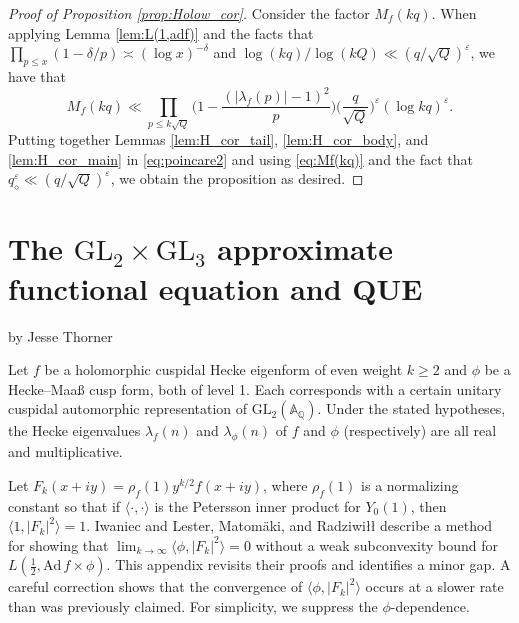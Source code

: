 \documentclass[12pt,reqno]{amsart}
\theoremstyle{remark}
\numberwithin{equation}{section}
\begin{document}
	\begin{proof}[Proof of Proposition \ref{prop:Holow_cor}]

 
		Consider the factor $M_f(kq)$. When applying Lemma \ref{lem:L(1,adf)} and the facts that $\prod_{p\le x}(1-\delta/p) \asymp (\log x)^{-\delta}$ and  $\log(kq)/\log(kQ) \ll (q/\sqrt{Q})^{\varepsilon}$, we have that
		\begin{equation}\label{eq:Mf(kq)}
			M_f(kq) \ll \prod_{p\le k\sqrt{Q}} \Big(1-\frac{(|\lambda_f(p)|-1)^2}{p}\Big)\Big(\frac{q}{\sqrt{Q}}\Big)^{\varepsilon}(\log kq)^\varepsilon.
		\end{equation}  
 		Putting together Lemmas \ref{lem:H_cor_tail}, \ref{lem:H_cor_body}, and \ref{lem:H_cor_main} in \eqref{eq:poincare2} and using \eqref{eq:Mf(kq)} and the fact that $q_\diamond^{\varepsilon} \ll (q/\sqrt{Q})^\varepsilon$, we obtain the proposition as desired. 
        \end{proof}
        

\appendix
\section{The \texorpdfstring{$\mathrm{GL}_2\times\mathrm{GL}_3$}{GL23} approximate functional equation and QUE}
\label{appendix}
\begin{center} {\sc by Jesse Thorner}
\end{center}
\vspace{3mm}
Let $f$ be a holomorphic cuspidal Hecke eigenform of even weight $k\geq 2$ and $\phi$ be a Hecke--Maa{\ss} cusp form, both of level 1.  Each corresponds with a certain unitary cuspidal automorphic representation of $\mathrm{GL}_2(\mathbb{A}_{\mathbb{Q}})$.  Under the stated hypotheses, the Hecke eigenvalues $\lambda_{f}(n)$ and $\lambda_{\phi}(n)$ of $f$ and $\phi$ (respectively) are all real and multiplicative.

Let $F_k(x+iy) = \rho_f(1) y^{k/2}f(x+iy)$, where $\rho_f(1)$ is a normalizing constant so that if $\langle \cdot,\cdot\rangle$ is the Petersson inner product for $Y_0(1)$, then $\langle 1,|F_k|^2\rangle=1$. 
Iwaniec \cite[Section 11]{Iwaniec} and Lester, Matom{\"a}ki, and Radziwi{\l}{\l} \cite[Section 4]{LMR} describe a method for showing that $\lim_{k\to\infty}\langle \phi,|F_k|^2\rangle=0$ without a weak subconvexity bound for $L(\tfrac{1}{2},\mathrm{Ad}\,f\times\phi)$. This appendix revisits their proofs and identifies a minor gap. A careful correction shows that the convergence of $\langle \phi, |F_k|^2\rangle$ occurs at a slower rate than was previously claimed.  For simplicity, we suppress the $\phi$-dependence.
\end{document}
